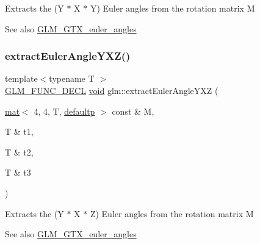 Extracts the (Y $\ast$ X $\ast$ Y) Euler angles from the rotation matrix M \begin{DoxySeeAlso}{See also}
\mbox{\hyperlink{group__gtx__euler__angles}{G\+L\+M\+\_\+\+G\+T\+X\+\_\+euler\+\_\+angles}} 
\end{DoxySeeAlso}
\mbox{\label{group__gtx__euler__angles_gaf0937518e63037335a0e8358b6f053c5}} 
\subsubsection{\texorpdfstring{extract\+Euler\+Angle\+Y\+X\+Z()}{extractEulerAngleYXZ()}}
{\footnotesize\ttfamily template$<$typename T $>$ \\
\mbox{\hyperlink{setup_8hpp_ab2d052de21a70539923e9bcbf6e83a51}{G\+L\+M\+\_\+\+F\+U\+N\+C\+\_\+\+D\+E\+CL}} \mbox{\hyperlink{_s_d_l__opengles2__gl2ext_8h_ae5d8fa23ad07c48bb609509eae494c95}{void}} glm\+::extract\+Euler\+Angle\+Y\+XZ (\begin{DoxyParamCaption}\item[{\mbox{\hyperlink{structglm_1_1mat}{mat}}$<$ 4, 4, T, \mbox{\hyperlink{namespaceglm_a36ed105b07c7746804d7fdc7cc90ff25a9d21ccd8b5a009ec7eb7677befc3bf51}{defaultp}} $>$ const \&}]{M,  }\item[{T \&}]{t1,  }\item[{T \&}]{t2,  }\item[{T \&}]{t3 }\end{DoxyParamCaption})}

Extracts the (Y $\ast$ X $\ast$ Z) Euler angles from the rotation matrix M \begin{DoxySeeAlso}{See also}
\mbox{\hyperlink{group__gtx__euler__angles}{G\+L\+M\+\_\+\+G\+T\+X\+\_\+euler\+\_\+angles}} 
\end{DoxySeeAlso}
\mbox{\label{group__gtx__euler__angles_ga9049b78466796c0de2971756e25b93d3}} 
